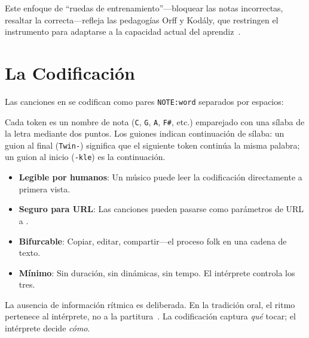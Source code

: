 \documentclass[11pt]{article}
\begin{document}
Este enfoque de ``ruedas de entrenamiento''---bloquear las notas incorrectas, resaltar la correcta---refleja las pedagogías Orff y Kod\'aly, que restringen el instrumento para adaptarse a la capacidad actual del aprendiz~\citep{kodaly1971folk, orff1978schulwerk}.

\section{La Codificación}

Las canciones en \np{} se codifican como pares \texttt{NOTE:word} separados por espacios:


Cada token es un nombre de nota (\texttt{C}, \texttt{G}, \texttt{A}, \texttt{F\#}, etc.) emparejado con una sílaba de la letra mediante dos puntos. Los guiones indican continuación de sílaba: un guion al final (\texttt{Twin-}) significa que el siguiente token continúa la misma palabra; un guion al inicio (\texttt{-kle}) es la continuación.

\begin{card}
\begin{itemize}
  \item \textbf{Legible por humanos}: Un músico puede leer la codificación directamente a primera vista.
  \item \textbf{Seguro para URL}: Las canciones pueden pasarse como parámetros de URL a \np{}.
  \item \textbf{Bifurcable}: Copiar, editar, compartir---el proceso folk en una cadena de texto.
  \item \textbf{Mínimo}: Sin duración, sin dinámicas, sin tempo. El intérprete controla los tres.
\end{itemize}
\end{card}

La ausencia de información rítmica es deliberada. En la tradición oral, el ritmo pertenece al intérprete, no a la partitura~\citep{lomax1968folk}. La codificación captura \emph{qué} tocar; el intérprete decide \emph{cómo}.

\end{document}

